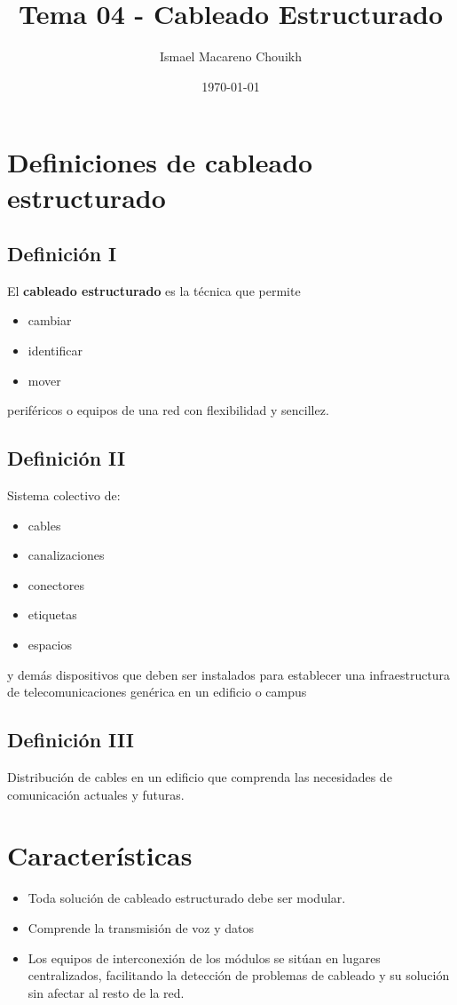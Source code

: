 \documentclass[11pt]{article}
\author{Ismael Macareno Chouikh}
\date{\today}
\title{Tema 04 - Cableado Estructurado}
\newcommand\blankpage{\null\thispagestyle{empty}\newpage}
\begin{document}
\maketitle
\tableofcontents

\blankpage

\section{Definiciones de cableado estructurado}
\label{sec:orgb986b21}
\subsection{Definición I}
\label{sec:org7222b1d}
El \textbf{cableado estructurado} es la técnica que permite
\begin{itemize}
\item cambiar
\item identificar
\item mover
\end{itemize}
periféricos o equipos de una red con flexibilidad y sencillez.
\subsection{Definición II}
\label{sec:org125738b}
Sistema colectivo de:
\begin{itemize}
\item cables
\item canalizaciones
\item conectores
\item etiquetas
\item espacios
\end{itemize}
y demás dispositivos que deben ser instalados para establecer una infraestructura de telecomunicaciones genérica en un edificio o campus
\subsection{Definición III}
\label{sec:org0055c92}
Distribución de cables en un edificio que comprenda las necesidades de comunicación actuales y futuras.

\section{Características}
\label{sec:org6728703}
\begin{itemize}
\item Toda solución de cableado estructurado debe ser modular.
\item Comprende la transmisión de voz y datos
\item Los equipos de interconexión de los módulos se sitúan en lugares centralizados, facilitando la detección de problemas de cableado y su solución sin afectar al resto de la red.
\end{itemize}
\end{document}
